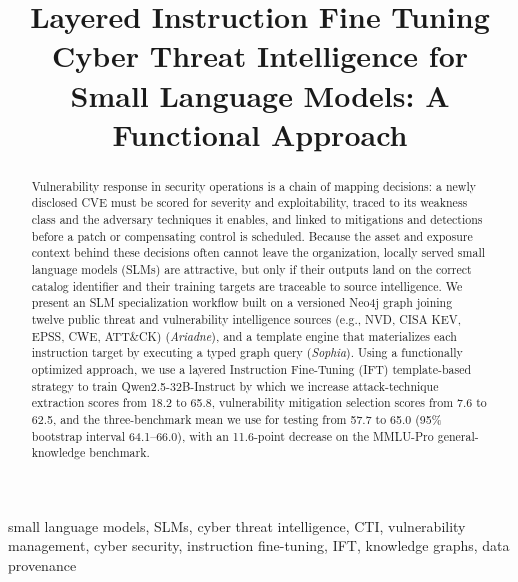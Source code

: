 \documentclass[conference]{IEEEtran}
\begin{document}

\title{Layered Instruction Fine Tuning Cyber Threat Intelligence for Small Language Models: A Functional Approach}

\author{}

\maketitle
\pagestyle{plain}
\thispagestyle{plain}

\begin{abstract}
Vulnerability response in security operations is a chain of mapping decisions: a newly disclosed CVE must be scored for severity and exploitability, traced to its weakness class and the adversary techniques it enables, and linked to mitigations and detections before a patch or compensating control is scheduled. Because the asset and exposure context behind these decisions often cannot leave the organization, locally served small language models (SLMs) are attractive, but only if their outputs land on the correct catalog identifier and their training targets are traceable to source intelligence. We present an SLM specialization workflow built on a versioned Neo4j graph joining twelve public threat and vulnerability intelligence sources (e.g., NVD, CISA KEV, EPSS, CWE, ATT\&CK) (\emph{Ariadne}), and a template engine that materializes each instruction target by executing a typed graph query (\emph{Sophia}). Using a functionally optimized approach, we use a layered Instruction Fine-Tuning (IFT) template-based strategy to train Qwen2.5-32B-Instruct by which we increase attack-technique extraction scores from 18.2 to 65.8, vulnerability mitigation selection scores from 7.6 to 62.5, and the three-benchmark mean we use for testing from 57.7 to 65.0 (95\% bootstrap interval 64.1--66.0), with an 11.6-point decrease on the MMLU-Pro general-knowledge benchmark.
\end{abstract}

\begin{IEEEkeywords}
small language models, SLMs, cyber threat intelligence, CTI, vulnerability management, cyber security, instruction fine-tuning, IFT, knowledge graphs, data provenance
\end{IEEEkeywords}
\end{document}
